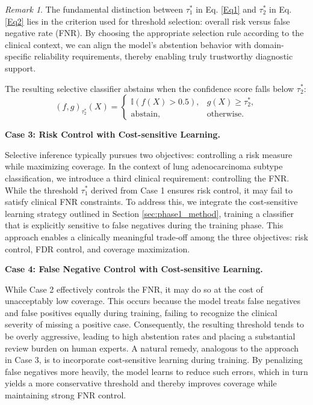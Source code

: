 \documentclass[sigconf,review,anonymous]{acmart}
\theoremstyle{remark}
\newtheorem{remark}[theorem]{Remark}
\begin{document}
\begin{remark}
The fundamental distinction between $\tau_{1}^{*}$ in Eq. \ref{Eq1} and $\tau_{2}^{*}$ in Eq. \ref{Eq2} lies in the criterion used for threshold selection: overall risk versus false negative rate (FNR). By choosing the appropriate selection rule according to the clinical context, we can align the model's abstention behavior with domain-specific reliability requirements, thereby enabling truly trustworthy diagnostic support.
\end{remark}

The resulting selective classifier abstains when the confidence score falls below $\tau_{2}^*$:
\[
(f,g)_{\tau_{2}^*}(X)=
\begin{cases}
\mathbb{I}\!\left(f(X)>0.5\right), & g(X)\geq \tau_{2}^*,\\[4pt]
\text{abstain}, & \text{otherwise}.
\end{cases}
\]


\textbf{Case 3: Risk Control with Cost-sensitive Learning.}

Selective inference typically pursues two objectives: controlling a risk measure while maximizing coverage. In the context of lung adenocarcinoma subtype classification, we introduce a third clinical requirement: controlling the FNR. While the threshold \(\tau_{1}^{*}\) derived from Case 1 ensures risk control, it may fail to satisfy clinical FNR constraints. To address this, we integrate the cost-sensitive learning strategy outlined in Section \ref{sec:phase1_method}, training a classifier that is explicitly sensitive to false negatives during the training phase. This approach enables a clinically meaningful trade‑off among the three objectives: risk control, FDR control, and coverage maximization.

\textbf{Case 4: False Negative Control with Cost-sensitive Learning.}

While Case 2 effectively controls the FNR, it may do so at the cost of unacceptably low coverage. This occurs because the model treats false negatives and false positives equally during training, failing to recognize the clinical severity of missing a positive case. Consequently, the resulting threshold tends to be overly aggressive, leading to high abstention rates and placing a substantial review burden on human experts. A natural remedy, analogous to the approach in Case 3, is to incorporate cost‑sensitive learning during training. By penalizing false negatives more heavily, the model learns to reduce such errors, which in turn yields a more conservative threshold and thereby improves coverage while maintaining strong FNR control.
\end{document}
